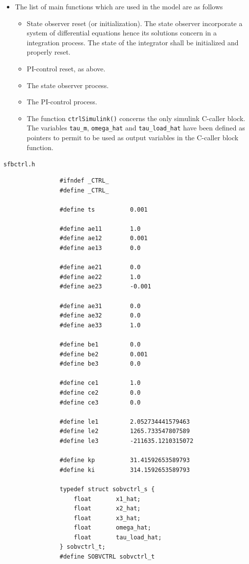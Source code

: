 \documentclass[12pt,a4paper,oneside]{book}
\begin{document}
\begin{onehalfspace}
\begin{itemize}
		\item The list of main functions which are used in the model are as follows
		\begin{itemize}
			\item State observer reset (or initialization). The state observer incorporate a system of differential equations hence its solutions concern in a integration process. The state of the integrator shall be initialized and properly reset. 
			\item PI-control reset, as above.
			\item The state observer process.
			\item The PI-control process. 
			\item The function \texttt{ctrlSimulink()} concerns the only simulink C-caller block. The variables \texttt{tau\_m}, \texttt{omega\_hat} and \texttt{tau\_load\_hat} have been defined as pointers to permit to be used as output variables in the C-caller block function.
		\end{itemize}   
	\end{itemize}
	
	\begin{mybox}
		\begin{center}
			{\selectfont \verb+sfbctrl.h+}
		\end{center}
		{\selectfont \footnotesize \noindent
			\begin{verbatim}
				#ifndef _CTRL_
				#define _CTRL_
				
				#define ts			0.001
				
				#define ae11		1.0
				#define ae12		0.001
				#define ae13		0.0
				
				#define ae21		0.0
				#define ae22		1.0
				#define ae23		-0.001
				
				#define ae31		0.0
				#define ae32		0.0
				#define ae33		1.0
				
				#define be1			0.0
				#define be2			0.001
				#define be3			0.0
				
				#define ce1			1.0
				#define ce2			0.0
				#define ce3			0.0
				
				#define le1			2.052734441579463
				#define le2			1265.733547807589
				#define le3			-211635.1210315072
				
				#define kp			31.41592653589793
				#define ki			314.1592653589793
				
				typedef struct sobvctrl_s {
				    float		x1_hat;			
				    float		x2_hat;					
				    float		x3_hat;					
				    float		omega_hat;					
				    float		tau_load_hat;					
				} sobvctrl_t;
				#define SOBVCTRL sobvctrl_t
				

\end{verbatim}}
\end{mybox}
\end{onehalfspace}
\end{document}
